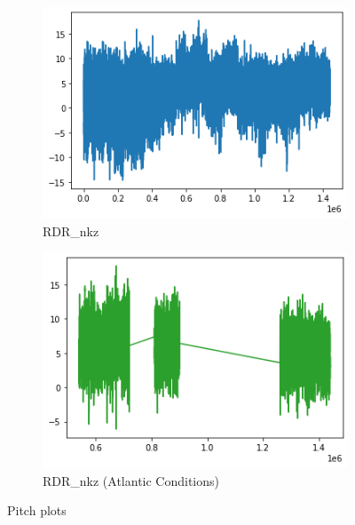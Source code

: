 \begin{figure}[h]
     \centering
     \begin{subfigure}[t]{0.49\textwidth}
         \centering
         \includegraphics[width=\textwidth]{figures/distributions/RDR-Pitch.png}
         \caption{RDR\_nkz}
     \end{subfigure}
     \hfill
     \begin{subfigure}[t]{0.49\textwidth}
         \centering
         \includegraphics[width=\textwidth]{figures/distributions/RDR-atlantic-Pitch.png}
         \caption{RDR\_nkz (Atlantic Conditions)}
     \end{subfigure}
        \caption{Pitch plots}
\end{figure}
